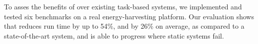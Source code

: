 %

To asses the benefits of \sys over existing task-based systems, we implemented and tested six
benchmarks on a real energy-harvesting platform.
Our evaluation shows that \sys reduces run time by up to 54\%, and by 26\% on average, as compared to a state-of-the-art system, and is able to progress where static systems fail.
 
